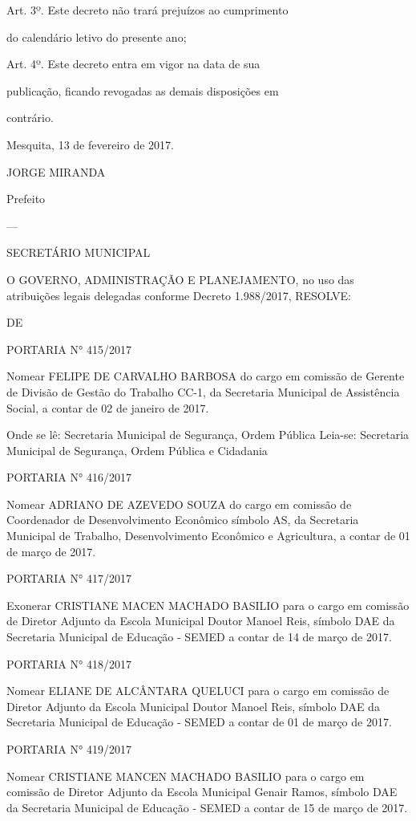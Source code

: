 \documentclass{doliberto}
\begin{document}
Art.  3º.    Este  decreto  não  trará  prejuízos  ao  cumprimento 

do calendário letivo do presente ano; 

Art.  4º.  Este  decreto  entra  em  vigor  na  data  de  sua 

publicação,  ficando  revogadas  as  demais  disposições  em 

contrário. 

Mesquita, 13 de fevereiro de 2017. 

JORGE MIRANDA 

Prefeito 

---

SECRETÁRIO  MUNICIPAL 

O 
GOVERNO, 
ADMINISTRAÇÃO  E  PLANEJAMENTO,  no  uso  das 
atribuições legais delegadas conforme Decreto 1.988/2017, 
RESOLVE: 

DE 

PORTARIA N° 415/2017 

Nomear  FELIPE  DE  CARVALHO  BARBOSA  do  cargo  em 
comissão  de  Gerente  de  Divisão  de  Gestão  do  Trabalho 
CC-1,  da  Secretaria  Municipal  de  Assistência  Social,  a 
contar de 02 de janeiro de 2017. 

Onde se lê: 
Secretaria Municipal de Segurança, Ordem Pública  
Leia-se: 
Secretaria  Municipal  de  Segurança,  Ordem  Pública  e 
Cidadania 

PORTARIA N° 416/2017 

Nomear  ADRIANO  DE  AZEVEDO  SOUZA  do  cargo  em 
comissão  de  Coordenador  de  Desenvolvimento 
Econômico  símbolo  AS,  da  Secretaria  Municipal  de 
Trabalho, Desenvolvimento Econômico e Agricultura, a 
contar de 01 de março de 2017. 

PORTARIA N° 417/2017 

Exonerar  CRISTIANE  MACEN  MACHADO  BASILIO  para  o 
cargo  em  comissão  de  Diretor  Adjunto  da  Escola 
Municipal  Doutor  Manoel  Reis,  símbolo  DAE  da 
Secretaria  Municipal  de  Educação  -  SEMED  a  contar  de 
14 de março de 2017. 

PORTARIA N° 418/2017 

Nomear  ELIANE  DE  ALCÂNTARA  QUELUCI  para  o  cargo 
em  comissão  de  Diretor  Adjunto  da  Escola  Municipal 
Doutor  Manoel  Reis,  símbolo  DAE  da  Secretaria 
Municipal de Educação - SEMED a contar de 01 de março 
de 2017. 

PORTARIA N° 419/2017 

Nomear  CRISTIANE  MANCEN  MACHADO  BASILIO  para  o 
cargo  em  comissão  de  Diretor  Adjunto  da  Escola 
Municipal  Genair  Ramos,  símbolo  DAE  da  Secretaria 
Municipal de Educação - SEMED a contar de 15 de março 
de 2017. 
\end{document}
